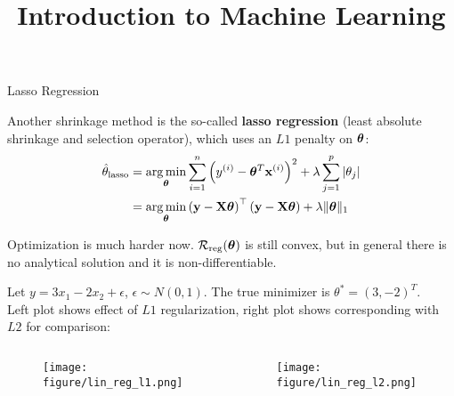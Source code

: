 \documentclass[11pt,compress,t,notes=noshow, xcolor=table]{beamer}
\title{Introduction to Machine Learning}
\date{}
\begin{document}


\begin{vbframe}{Lasso Regression}

Another shrinkage method is the so-called \textbf{lasso regression} ({\scriptsize{least absolute shrinkage and selection operator}}), which uses an $L1$ penalty on $\bm{\theta}$:
\vspace{0.4cm}
\begin{align*}
\hat{\theta}_{\text{lasso}}&= \operatorname*{arg\,min}_{\bm{\theta}} \sum\limits_{i=1}^n \left(y^{(i)} - \bm{\theta}^T \mathbf{x}^{(i)}\right)^2 + \lambda \sum_{j=1}^{p} \vert\theta_j\vert\\
&= \operatorname*{arg\,min}_{\bm{\theta}}\left(\mathbf{y} - \mathbf{X} \bm{\theta}\right)^\top \left(\mathbf{y} - \mathbf{X} \bm{\theta}\right) + \lambda \|\bm{\theta}\|_1
\end{align*}

\vspace{0.4cm}

Optimization is much harder now. $\mathcal{R}_{\text{reg}}(\bm{\theta})$ is still convex, but in general there is no analytical solution and it is non-differentiable.\\
\vspace{0.2cm}


\framebreak

Let $y=3x_{1} -2x_{2} +\epsilon $, $ \epsilon \sim N( 0,1)$. The true minimizer is $\theta ^{*} =( 3,-2)^{T}$. \\
\vspace{0.1cm}
Left plot shows effect of $L1$ regularization, right plot shows corresponding with $L2$ for comparison:
\begin{columns}
\begin{column}{0.5\textwidth}
\lz
\begin{figure}
\texttt{[image: figure/lin\_reg\_l1.png]}
\end{figure}
\end{column}

\begin{column}{0.5\textwidth}
\lz
\begin{figure}
\texttt{[image: figure/lin\_reg\_l2.png]}
\end{figure}
\end{column}
\end{columns}


\end{vbframe}
\end{document}
